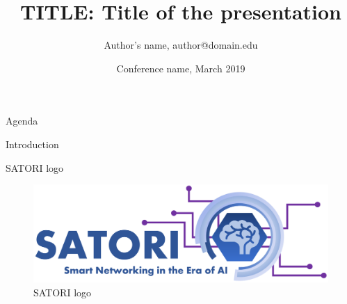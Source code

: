 \documentclass[aspectratio=169]{beamer}
\title{TITLE: Title of the presentation}
\author{Author's name, author@domain.edu}
\institute{University of affiliation}
\date{Conference name, March 2019}
\begin{document}
{
    \maketitle
}
\addtocounter{framenumber}{-1}


\begin{frame}{Agenda}
    \blindenumerate[5]
\end{frame}

\begin{frame}{Introduction}
    \blindenumerate[5]
\end{frame}

\begin{frame}{SATORI logo}
    \begin{figure}
        \centering
        \includegraphics[width=0.7\linewidth]{logos/satori-big-logo.pdf}
        \caption{SATORI logo}
        \label{fig:satori-logo}
    \end{figure}
\end{frame}

\end{document}
